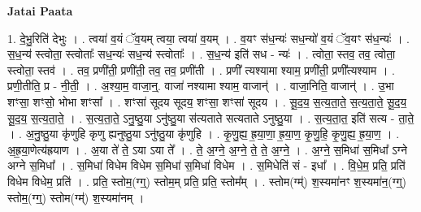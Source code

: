 \documentclass[17pt]{extarticle}
\begin{document}
\textbf{Jatai Paata} \newline

1. दे॒भु॒रिति॑ देभुः । . त्वया॑ व॒यं ॅव॒यम् त्वया॒ त्वया॑ व॒यम् । . व॒यꣳ स॑ध॒न्यः॑ सध॒न्यो॑ व॒यं ॅव॒यꣳ स॑ध॒न्यः॑ । . स॒ध॒न्य॑ स्त्वोता॒ स्त्वोताः᳚ सध॒न्यः॑ सध॒न्य॑ स्त्वोताः᳚ । . स॒ध॒न्य॑ इति॑ सध - न्यः॑ । . त्वोता॒ स्तव॒ तव॒ त्वोता॒ स्त्वोता॒ स्तव॑ । . तव॒ प्रणी॑ती॒ प्रणी॑ती॒ तव॒ तव॒ प्रणी॑ती । . प्रणी᳚ त्यश्यामा श्याम॒ प्रणी॑ती॒ प्रणी᳚त्यश्याम । . प्रणी॒तीति॒ प्र - नी॒ती॒ । . अ॒श्या॒म॒ वाजा॒न्॒. वाजा॑ नश्यामा श्याम॒ वाजान्॑ । . वाजा॒निति॒ वाजान्॑ । . उ॒भा शꣳसा॒ शꣳसो॒ भोभा शꣳसा᳚ । . शꣳसा॑ सूदय सूदय॒ शꣳसा॒ शꣳसा॑ सूदय । . सू॒द॒य॒ स॒त्य॒ता॒ते॒ स॒त्य॒ता॒ते॒ सू॒द॒य॒ सू॒द॒य॒ स॒त्य॒ता॒ते॒ । . स॒त्य॒ता॒ते॒ ऽनु॒ष्ठु॒या ऽनु॑ष्ठु॒या स॑त्यताते सत्यताते ऽनुष्ठु॒या । . स॒त्य॒ता॒त॒ इति॑ सत्य - ता॒ते॒ । . अ॒नु॒ष्ठु॒या कृ॑णुहि कृणु ह्यनुष्ठु॒या ऽनु॑ष्ठु॒या कृ॑णुहि । . कृ॒णु॒ह्य॒ ह्र॒या॒णा॒ ह्र॒या॒ण॒ कृ॒णु॒हि॒ कृ॒णु॒ह्य॒ ह्र॒या॒ण॒ । . अ॒ह्र॒या॒णेत्य॑ह्रयाण । . अ॒या ते॑ ते॒ ऽया ऽया ते᳚ । . ते॒ अ॒ग्ने॒ अ॒ग्ने॒ ते॒ ते॒ अ॒ग्ने॒ । . अ॒ग्ने॒ स॒मिधा॑ स॒मिधा᳚ ऽग्ने अग्ने स॒मिधा᳚ । . स॒मिधा॑ विधेम विधेम स॒मिधा॑ स॒मिधा॑ विधेम । . स॒मिधेति॑ सं - इधा᳚ । . वि॒धे॒म॒ प्रति॒ प्रति॑ विधेम विधेम॒ प्रति॑ । . प्रति॒ स्तोम॒(ग्ग्॒) स्तोम॒म् प्रति॒ प्रति॒ स्तोम᳚म् । . स्तोम(ग्म्॑) श॒स्यमा॑नꣳ श॒स्यमा॑न॒(ग्ग्॒) स्तोम॒(ग्ग्॒) स्तोम(ग्म्॑) श॒स्यमा॑नम् । \newline
\end{document}
